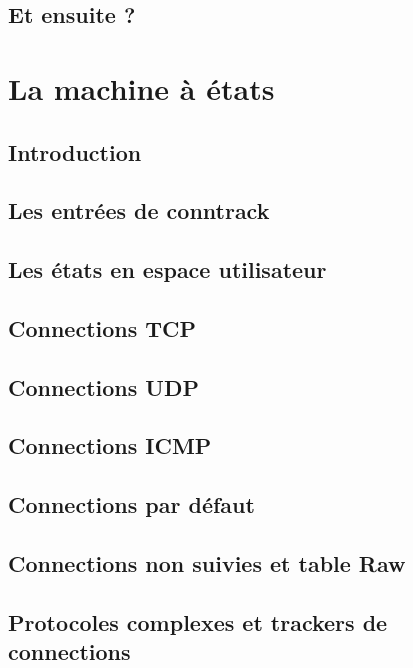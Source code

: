 \documentclass[a4paper,11pt]{report}
\begin{document}
\section{Et ensuite ?}

\chapter{La machine à états}

\section{Introduction}

\section{Les entrées de conntrack}

\section{Les états en espace utilisateur}

\section{Connections TCP}

\section{Connections UDP}

\section{Connections ICMP}

\section{Connections par défaut}

\section{Connections non suivies et table Raw}

\section{Protocoles complexes et trackers de connections}
\end{document}
